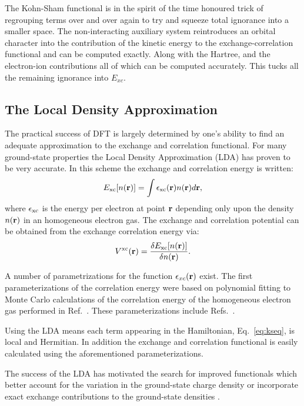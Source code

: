 The Kohn-Sham functional is in the spirit of the time honoured trick of regrouping
terms over and over again to try and squeeze total 
ignorance into a smaller space. The non-interacting auxiliary system 
reintroduces an orbital character into the contribution of the kinetic
energy to the exchange-correlation functional and can be computed exactly.
Along with the Hartree, and the electron-ion contributions all of which can
be computed accurately. This tucks all the remaining ignorance into $E_{xc}$.
%
\subsection{The Local Density Approximation}
\noindent
\label{sec:thelda}
The practical success of DFT is largely determined by one's ability to
find an adequate approximation to the exchange and correlation functional.
For many ground-state properties the Local Density Approximation (LDA) 
has proven to be very accurate. In this scheme the exchange and correlation energy
is written:
%
\begin{equation}
E_{\rm{xc}}[n({\bf r})] = \int \epsilon_{\rm{xc}}({\bf r})n({\bf r})d{\bf r},
\end{equation}
%
where $\epsilon_{\rm{xc}}$ is the energy per electron at point ${\bf r}$ 
depending only upon the density $n({\bf r})$ in an homogeneous electron 
gas\cite{martin}. The exchange and correlation potential 
can be obtained from the exchange correlation energy via:
%
\begin{equation}
\label{eq:kohnshampot}
V^{\rm{xc}}({\bf r}) = \frac{\delta E_{\rm{xc}}[n({\bf r})]}{\delta n({\bf r})}.
\end{equation}
%

A number of parametrizations for the function $\epsilon_{xc}({\bf r})$ exist.
The first parameterizations of the correlation energy were based
on polynomial fitting to Monte Carlo calculations of the correlation energy
of the homogeneous electron gas performed in Ref.~\cite{ceperly80}.
These parameterizations include Refs.~\cite{vosko80, perdew81, perdewwang92}.

Using the LDA means each term appearing in the Hamiltonian, Eq.~\ref{eq:kseq},
is local and Hermitian. In addition the exchange and correlation functional is easily 
calculated using the aforementioned parameterizations.

The success of the LDA has motivated the search for improved
functionals which better account for the variation in the 
ground-state charge density or incorporate exact exchange contributions
to the ground-state densities \cite{becke88, perdew96, becke93, becke93b}.

